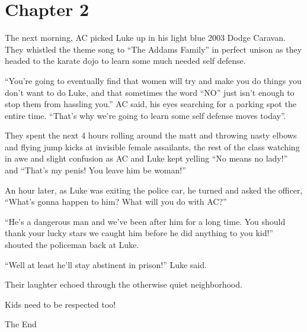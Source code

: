 \section*{Chapter 2}

The next morning, AC picked Luke up in his light blue 2003 Dodge
Caravan. They whistled the theme song to ``The Addams
Family'' in perfect unison as they headed to the karate dojo
to learn some much needed self defense.



``You're going to eventually find that women will try
and make you do things you don't want to do Luke, and that
sometimes the word ``NO'' just isn't enough to stop
them from hassling you.'' AC said, his eyes searching for a
parking spot the entire time. ``That's why we're
going to learn some self defense moves today''.



They spent the next 4 hours rolling around the matt and throwing
nasty elbows and flying jump kicks at invisible female assailants,
the rest of the class watching in awe and slight confusion as AC
and Luke kept yelling ``No means no lady!'' and
``That's my penis! You leave him be woman!''



An hour later, as Luke was exiting the police car, he turned and
asked the officer, ``What's gonna happen to him? What
will you do with AC?''



``He's a dangerous man and we've been after him for a long
time. You should thank your lucky stars we caught him before he did
anything to you kid!'' shouted the policeman back at
Luke.



``Well at least he'll stay abstinent in prison!''
Luke said.



Their laughter echoed through the otherwise quiet
neighborhood.



Kids need to be respected too!

The End
 



